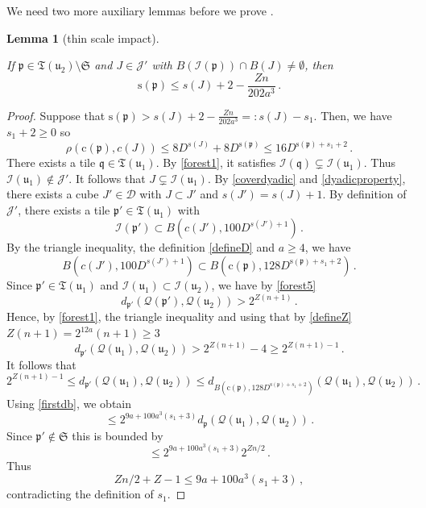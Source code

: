 \documentclass[10pt,a4paper]{article}
\theoremstyle{plain}
\newtheorem{lemma}[theorem]{Lemma}
\theoremstyle{definition}
\numberwithin{equation}{subsection}
\newcommand{\fp}{{\mathfrak p}}
\newcommand{\fu}{{\mathfrak u}}
\newcommand{\fq}{{\mathfrak q}}
\newcommand{\fT}{{\mathfrak T}}
\newcommand{\pc}{{\mathrm{c}}}
\newcommand{\ps}{{\mathrm{s}}}
\newcommand{\scI}{{\mathcal{I}}} %
\newcommand{\fcc}{{\mathcal{Q}}}
\newcommand{\lean}[1]{}
\newcommand{\leanok}{}
\begin{document}
    We need two more auxiliary lemmas before we prove .

    \begin{lemma}[thin scale impact]
        \label{thin-scale-impact}
        \leanok
        \lean{TileStructure.Forest.thin_scale_impact}
        If $\fp \in \fT(\fu_2) \setminus \mathfrak{S}$ and $J \in \mathcal{J'}$ with $B(\scI(\fp)) \cap B(J) \ne \emptyset$, then
        $$
            \ps(\fp) \le s(J) + 2 - \frac{Zn}{202a^3}\,.
        $$
    \end{lemma}

    \begin{proof}
        \leanok
        Suppose that $\ps(\fp) > s(J) + 2 -\frac{Zn}{202a^3} =: s(J) - s_1$. Then, we have $s_1 + 2 \ge 0$ so
        $$
            \rho(\pc(\fp), c(J)) \le 8D^{s(J)}+8D^{\ps(\fp)} \le 16 D^{\ps(\fp) + s_1 + 2}\,.
        $$
        There exists a tile $\fq \in \fT(\fu_1)$. By \eqref{forest1}, it satisfies $\scI(\fq) \subsetneq \scI(\fu_1)$. Thus $\scI(\fu_1) \notin \mathcal{J}'$. It follows that $J \subsetneq \scI(\fu_1)$. By \eqref{coverdyadic} and \eqref{dyadicproperty}, there exists a cube $J' \in \mathcal{D}$ with $J \subset J'$ and $s(J') = s(J) + 1$. By definition of $\mathcal{J}'$, there exists a tile $\fp' \in \fT(\fu_1)$ with
        $$
            \scI(\fp') \subset B(c(J'), 100 D^{s(J') + 1})\,.
        $$
        By the triangle inequality, the definition \eqref{defineD} and $a \ge 4$, we have
        $$
            B(c(J'), 100 D^{s(J')+1}) \subset B(\pc(\fp), 128 D^{\ps(\fp) + s_1 + 2})\,.
        $$
        Since $\fp' \in \fT(\fu_1)$ and $\scI(\fu_1) \subset \scI(\fu_2)$, we have by \eqref{forest5}
        $$
            d_{\fp'}(\fcc(\fp'), \fcc(\fu_2)) > 2^{Z(n+1)}\,.
        $$
        Hence, by \eqref{forest1}, the triangle inequality and using that by \eqref{defineZ} $Z(n+1) = 2^{12a}(n+1) \ge 3$
        $$
            d_{\fp'}(\fcc(\fu_1), \fcc(\fu_2)) > 2^{Z(n+1)} - 4 \ge 2^{Z(n+1) - 1}\,.
        $$
        It follows that
        $$
            2^{Z(n+1)-1} \le d_{\fp'}(\fcc(\fu_1), \fcc(\fu_2)) \le d_{B(\pc(\fp), 128 D^{\ps(\fp) + s_1+ 2})}(\fcc(\fu_1), \fcc(\fu_2))\,.
        $$
        Using \eqref{firstdb}, we obtain
        $$
            \le 2^{9a + 100a^3 (s_1+3)} d_{\fp}(\fcc(\fu_1), \fcc(\fu_2))\,.
        $$
        Since $\fp' \notin \mathfrak{S}$ this is bounded by
        $$
            \le 2^{9a + 100a^3 (s_1+3)} 2^{Zn/2}\,.
        $$
        Thus
        $$
            Z n/2 + Z - 1 \le 9a + 100a^3(s_1 + 3)\,,
        $$
        contradicting the definition of $s_1$.
    \end{proof}
\end{document}
